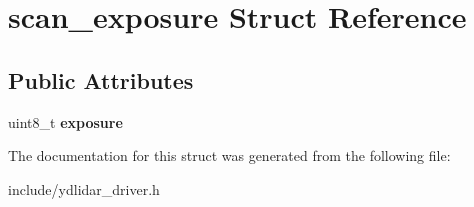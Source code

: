 \hypertarget{structscan__exposure}{}\section{scan\+\_\+exposure Struct Reference}
\label{structscan__exposure}
\subsection*{Public Attributes}
\begin{DoxyCompactItemize}
\item 
uint8\+\_\+t {\bfseries exposure}\hypertarget{structscan__exposure_a49591ef660667fcd1c3e1c2f3d764004}{}\label{structscan__exposure_a49591ef660667fcd1c3e1c2f3d764004}

\end{DoxyCompactItemize}


The documentation for this struct was generated from the following file\+:\begin{DoxyCompactItemize}
\item 
include/ydlidar\+\_\+driver.\+h\end{DoxyCompactItemize}
